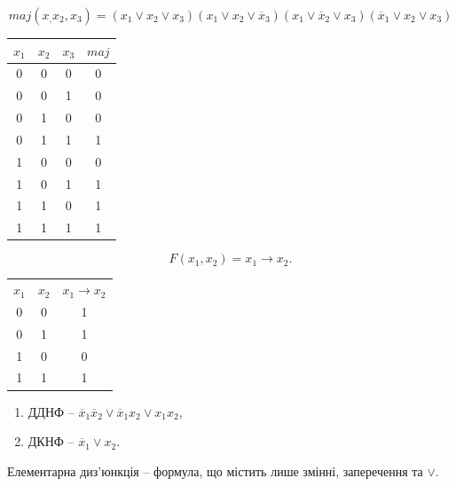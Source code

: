 \begin{example}
    \begin{equation*}
        maj(x_, x_2, x_3)
        = (x_1 \vee x_2 \vee x_3) (x_1 \vee x_2 \vee \overline{x}_3) (x_1 \vee \overline{x}_2 \vee x_3) (\overline{x}_1 \vee x_2 \vee x_3)
    \end{equation*}
    \begin{center}
        \begin{tabular}{ccc||c}
            $x_1$ & $x_2$ & $x_3$ & $maj$ \\
            \hline\hline
            0&0&0&0 \\
            0&0&1&0 \\
            0&1&0&0 \\
            0&1&1&1 \\
            1&0&0&0 \\
            1&0&1&1 \\
            1&1&0&1 \\
            1&1&1&1 \\
        \end{tabular}
    \end{center}
\end{example}

\begin{example}
    \begin{equation*}
        F(x_1, x_2) = x_1 \rightarrow x_2.
    \end{equation*}
    \begin{center}
        \begin{tabular}{cc||c}
            $x_1$ & $x_2$ & $x_1 \rightarrow x_2$ \\
            0&0&1 \\ 
            0&1&1 \\ 
            1&0&0 \\ 
            1&1&1 \\ 
        \end{tabular}
    \end{center}

    \begin{enumerate}
        \item ДДНФ -- $\overline{x}_1 \overline{x}_2 \vee \overline{x}_1 x_2 \vee x_1 x_2$,
        \item ДКНФ -- $\overline{x}_1 \vee x_2$.
    \end{enumerate}
\end{example}

\begin{definition}
    Елементарна диз'юнкція -- формула, що містить лише змінні, заперечення та $\vee$.
\end{definition}


